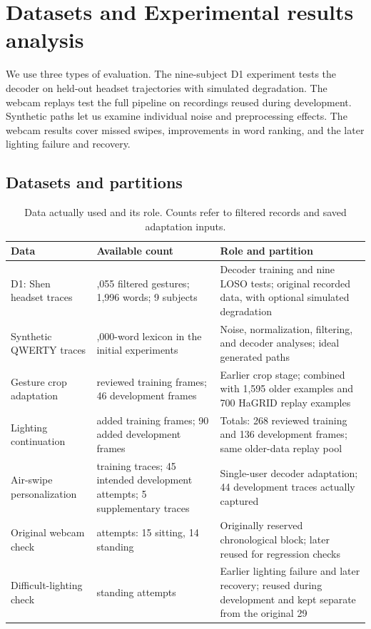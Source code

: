 \documentclass[preprint,12pt]{elsarticle}
\begin{document}
\section{Datasets and Experimental results analysis}
We use three types of evaluation. The nine-subject D1 experiment tests the decoder on held-out headset trajectories with simulated degradation. The webcam replays test the full pipeline on recordings reused during development. Synthetic paths let us examine individual noise and preprocessing effects. The webcam results cover missed swipes, improvements in word ranking, and the later lighting failure and recovery.

\subsection{Datasets and partitions}
\begin{table}[!htbp]
\centering
\caption{Data actually used and its role. Counts refer to filtered records and saved adaptation inputs.}
\label{tab:data}
\begingroup\small{}
\begin{tabularx}{\linewidth}{>{\raggedright\arraybackslash}p{2.8cm}>{\raggedright\arraybackslash}p{3.3cm}>{\raggedright\arraybackslash}X}
\toprule
Data & Available count & Role and partition \\
\midrule
D1: Shen headset traces & 18,055 filtered gestures; 1,996 words; 9 subjects & Decoder training and nine LOSO tests; original recorded data, with optional simulated degradation \\
Synthetic QWERTY traces & 3,000-word lexicon in the initial experiments & Noise, normalization, filtering, and decoder analyses; ideal generated paths \\
Gesture crop adaptation & 183 reviewed training frames; 46 development frames & Earlier crop stage; combined with 1,595 older examples and 700 HaGRID replay examples \\
Lighting continuation & 85 added training frames; 90 added development frames & Totals: 268 reviewed training and 136 development frames; same older-data replay pool \\
Air-swipe personalization & 79 training traces; 45 intended development attempts; 5 supplementary traces & Single-user decoder adaptation; 44 development traces actually captured \\
Original webcam check & 29 attempts: 15 sitting, 14 standing & Originally reserved chronological block; later reused for regression checks \\
Difficult-lighting check & 15 standing attempts & Earlier lighting failure and later recovery; reused during development and kept separate from the original 29 \\
\bottomrule
\end{tabularx}
\endgroup
\end{table}
\end{document}
